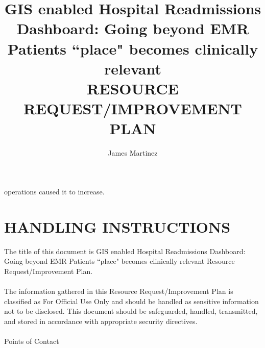 \documentclass[11pt]{article}\usepackage[]{graphicx}\usepackage[]{color}
\title{GIS enabled Hospital Readmissions Dashboard:
 Going beyond EMR Patients ``place" becomes clinically relevant\\
\smallskip
  \large RESOURCE REQUEST/IMPROVEMENT PLAN\\ }
\author{James Martinez}
\begin{document}
\maketitle
\newpage	
\tableofcontents
\newpage	


operations caused it to increase.

\section{HANDLING INSTRUCTIONS}

The title of this document is GIS enabled Hospital Readmissions Dashboard: Going beyond EMR  Patients ``place" becomes clinically relevant Resource Request/Improvement Plan.
\paragraph{}

The information gathered in this Resource Request/Improvement Plan is classified as For Official Use Only and should be handled as sensitive information not to be disclosed. This document should be safeguarded, handled, transmitted, and stored in accordance with appropriate security directives.
\paragraph{}
Points of Contact
\paragraph{}
\end{document}
